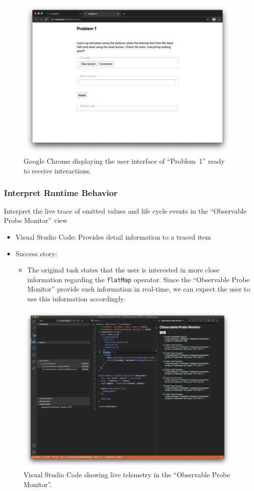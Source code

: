\documentclass[sigplan,screen,nonacm,review]{acmart}
\begin{document}
\begin{figure}[ht]
	\centering
	\includegraphics[width=\columnwidth]{walkthrough-screenshots/step7.png}
	\Description{}
	\caption{Google Chrome displaying the user interface of ``Problem~1'' ready to receive interactions.}
	\label{fig:walkthrough-screesnhot-step-7}
\end{figure}

\subsubsection{Interpret Runtime Behavior}
Interpret the live trace of emitted values and life cycle events in the ``Observable Probe Monitor'' view

\begin{itemize}
	\item Visual Studio Code: Provides detail information to a traced item
	\item Success story:
	      \begin{itemize}
	      	\item The original task states that the user is interested in more close information regarding the \texttt{flatMap} operator. Since the ``Observable Probe Monitor'' provide such information in real-time, we can expect the user to use this information accordingly.
	      \end{itemize}
\end{itemize}

\begin{figure}[ht]
	\centering
	\includegraphics[width=\columnwidth]{walkthrough-screenshots/step8.png}
	\Description{}
	\caption{Visual Studio Code showing live telemetry in the ``Observable Probe Monitor''.}
	\label{fig:walkthrough-screesnhot-step-8}
\end{figure}
\end{document}
